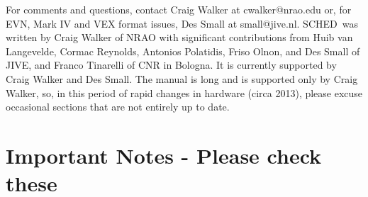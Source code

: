 \documentclass{report}
\newcommand{\schedb}{{\sc SCHED~}}
\begin{document}
For comments and questions, contact Craig Walker at cwalker@nrao.edu
or, for EVN, Mark IV and VEX format issues, Des Small at
small@jive.nl.  \schedb was written by Craig Walker of NRAO with
significant contributions from Huib van Langevelde, Cormac Reynolds,
Antonios Polatidis, Friso Olnon, and Des Small of JIVE, and Franco
Tinarelli of CNR in Bologna.  It is currently supported by Craig
Walker and Des Small.  The manual is long and is supported only
by Craig Walker, so, in this period of rapid changes in hardware
(circa 2013), please excuse occasional sections that are not 
entirely up to date.

\tableofcontents

\section{\label{SEC:NOTES} Important Notes - Please check these}
\end{document}
